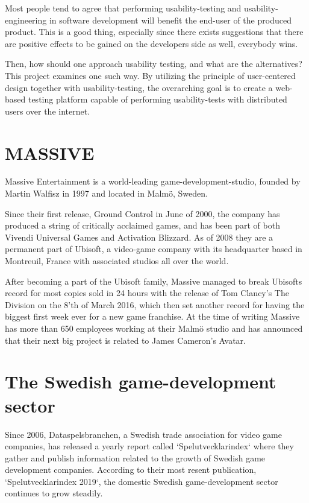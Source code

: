 Most people tend to agree that performing usability-testing and
usability-engineering in software development will benefit the end-user of the
produced product. This is a good thing, especially since there exists
suggestions that there are positive effects to be gained on the developers side
as well, everybody wins.

Then, how should one approach usability testing, and what are the alternatives?
This project examines one such way. By utilizing the principle of user-centered
design together with usability-testing, the overarching goal is to create a
web-based testing platform capable of performing usability-tests with
distributed users over the internet.

\section[MASSIVE Entertainment | A Ubisoft studio]{MASSIVE}

{}

  Massive Entertainment is a world-leading game-development-studio, founded by
  Martin Walfisz in 1997 and located in Malmö, Sweden.

  Since their first release, Ground Control in June of 2000,
  the company has produced a string of critically acclaimed games,
  and has been part of both Vivendi Universal Games and Activation Blizzard. As
  of 2008 they are a permanent part of Ubisoft, a video-game company
  with its headquarter based in Montreuil, France with associated studios all
  over the world.

  After becoming a part of the Ubisoft family, Massive managed to break
  Ubisofts record for most copies sold in 24 hours with the release of Tom
  Clancy's The Division on the 8'th of March 2016, which then set another
  record for having the biggest first week ever for a new game franchise.
  At the time of writing Massive has more than 650 employees working at their
  Malmö studio and has announced that their next big project is related to
  James Cameron's Avatar.

\section{The Swedish game-development sector}

  Since 2006, Dataspelsbranchen, a Swedish trade association for video game
  companies\cite{citeDataspelsbranchen}, has released a yearly report called
  `Spelutvecklarindex` where they gather and publish information related to the
  growth of Swedish game development companies.
  According to their most resent publication,
  `Spelutvecklarindex 2019`\cite{citeIndex2019}, the domestic Swedish
  game-development sector continues to grow steadily.

